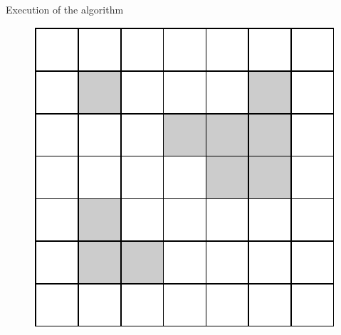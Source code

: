 \documentclass[10pt]{beamer}
\begin{document}
\begin{frame}{Execution of the algorithm}
    \begin{figure}
        \centering
        \includegraphics{figures/running-example/running-ex-init.pdf}
    \end{figure}
\end{frame}

\end{document}
